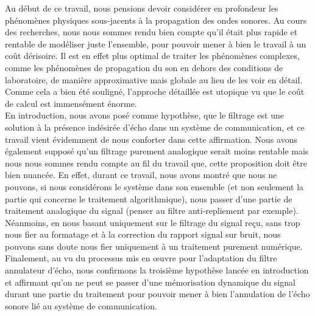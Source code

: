Au début de ce travail, nous pensions devoir considérer en profondeur les phénomènes physiques sous-jacents à la propagation des ondes sonores. Au cours des recherches, nous nous sommes rendu bien compte qu'il était plus rapide et rentable de modéliser juste l'ensemble, pour pouvoir mener à bien le travail à un coût dérisoire. Il est en effet plus optimal de traiter les phénomènes complexes, comme les phénomènes de propagation du son en dehors des conditions de laboratoire, de manière approximative mais globale au lieu de les voir en détail. Comme cela a bien été souligné, l'approche détaillée est utopique vu que le coût de calcul est immensément énorme.\\
En introduction, nous avons posé comme hypothèse, que le filtrage est une solution à la présence indésirée d'écho dans un système de communication, et ce travail vient évidemment de nous conforter dans cette affirmation. Nous avons également supposé qu'un filtrage purement analogique serait moins rentable mais nous nous sommes rendu compte au fil du travail que, cette proposition doit être bien nuancée. En effet, durant ce travail, nous avons montré que nous ne pouvons, si nous considérons le système dans son ensemble (et non seulement la partie qui concerne le traitement algorithmique), nous passer d'une partie de traitement analogique du signal (penser au filtre anti-repliement par exemple). Néanmoins, en nous basant uniquement sur le filtrage du signal reçu, sans trop nous fier au formatage et à la correction du rapport signal sur bruit, nous pouvons sans doute nous fier uniquement à un traitement purement numérique. Finalement, au vu du processus mis en œuvre pour l'adaptation du filtre annulateur d'écho, nous confirmons la troisième hypothèse lancée en introduction et affirmant qu'on ne peut se passer d'une mémorisation dynamique du signal durant une partie du traitement pour pouvoir mener à bien l'annulation de l'écho sonore lié au système de communication.
